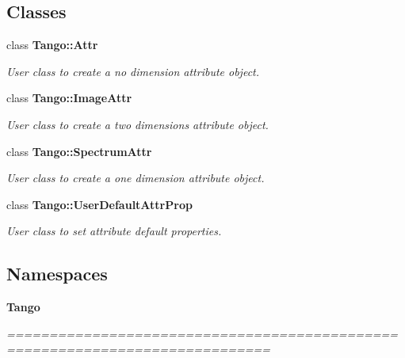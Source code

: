 \subsection*{Classes}
\begin{DoxyCompactItemize}
\item 
class {\bf Tango\-::\-Attr}
\begin{DoxyCompactList}\small\item\em User class to create a no dimension attribute object. \end{DoxyCompactList}\item 
class {\bf Tango\-::\-Image\-Attr}
\begin{DoxyCompactList}\small\item\em User class to create a two dimensions attribute object. \end{DoxyCompactList}\item 
class {\bf Tango\-::\-Spectrum\-Attr}
\begin{DoxyCompactList}\small\item\em User class to create a one dimension attribute object. \end{DoxyCompactList}\item 
class {\bf Tango\-::\-User\-Default\-Attr\-Prop}
\begin{DoxyCompactList}\small\item\em User class to set attribute default properties. \end{DoxyCompactList}\end{DoxyCompactItemize}
\subsection*{Namespaces}
\begin{DoxyCompactItemize}
\item 
{\bf Tango}
\begin{DoxyCompactList}\small\item\em ============================================================================= \end{DoxyCompactList}\end{DoxyCompactItemize}

